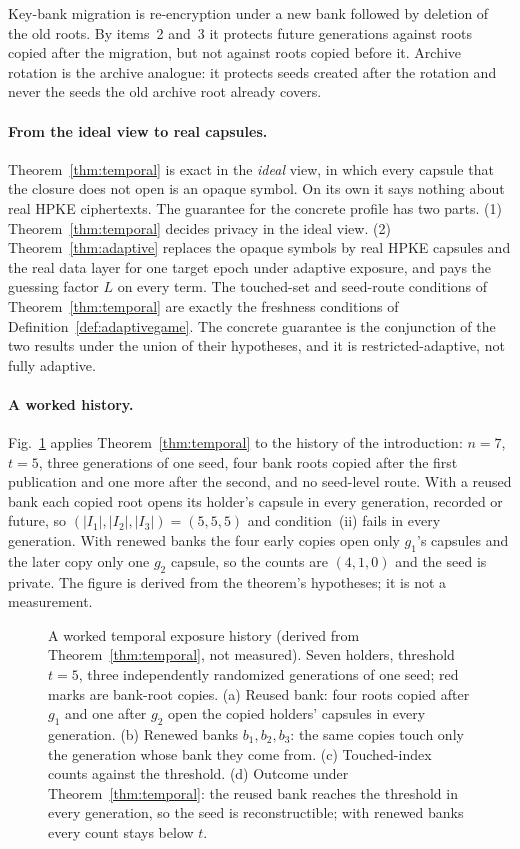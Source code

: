 \documentclass[pdflatex,sn-mathphys-num,twocolumn]{sn-jnl}
\theoremstyle{plain}
\theoremstyle{definition}
\begin{document}
Key-bank migration is re-encryption under a new bank followed by deletion of the old roots. By items~2 and~3 it protects future generations against roots copied after the migration, but not against roots copied before it. Archive rotation is the archive analogue: it protects seeds created after the rotation and never the seeds the old archive root already covers.

\paragraph{From the ideal view to real capsules.}
Theorem~\ref{thm:temporal} is exact in the \emph{ideal} view, in which every capsule that the closure does not open is an opaque symbol. On its own it says nothing about real HPKE ciphertexts. The guarantee for the concrete profile has two parts. (1) Theorem~\ref{thm:temporal} decides privacy in the ideal view. (2) Theorem~\ref{thm:adaptive} replaces the opaque symbols by real HPKE capsules and the real data layer for one target epoch under adaptive exposure, and pays the guessing factor $L$ on every term. The touched-set and seed-route conditions of Theorem~\ref{thm:temporal} are exactly the freshness conditions of Definition~\ref{def:adaptivegame}. The concrete guarantee is the conjunction of the two results under the union of their hypotheses, and it is restricted-adaptive, not fully adaptive.

\paragraph{A worked history.}
Fig.~\ref{fig:worked} applies Theorem~\ref{thm:temporal} to the history of the introduction: $n=7$, $t=5$, three generations of one seed, four bank roots copied after the first publication and one more after the second, and no seed-level route. With a reused bank each copied root opens its holder's capsule in every generation, recorded or future, so $(|I_1|,|I_2|,|I_3|)=(5,5,5)$ and condition~(ii) fails in every generation. With renewed banks the four early copies open only $g_1$'s capsules and the later copy only one $g_2$ capsule, so the counts are $(4,1,0)$ and the seed is private. The figure is derived from the theorem's hypotheses; it is not a measurement.

\begin{figure}[t]
\centering
\resizebox{\linewidth}{!}{}
\caption{A worked temporal exposure history (derived from Theorem~\ref{thm:temporal}, not measured). Seven holders, threshold $t=5$, three independently randomized generations of one seed; red marks are bank-root copies. (a) Reused bank: four roots copied after $g_1$ and one after $g_2$ open the copied holders' capsules in every generation. (b) Renewed banks $b_1,b_2,b_3$: the same copies touch only the generation whose bank they come from. (c) Touched-index counts against the threshold. (d) Outcome under Theorem~\ref{thm:temporal}: the reused bank reaches the threshold in every generation, so the seed is reconstructible; with renewed banks every count stays below $t$.}\label{fig:worked}
\end{figure}
\end{document}
